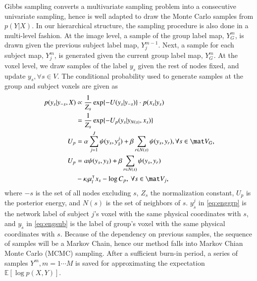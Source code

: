 \documentclass[final,authoryear,5p,twocolumn]{elsarticle}
\begin{document}
Gibbs sampling converts a multivariate sampling problem into a consecutive
univariate sampling, hence is well adapted to draw the Monte Carlo samples from
$p(Y|X)$.  In our hierarchical structure, the sampling procedure is also done in
a multi-level fashion. At the image level, a sample of the group label map,
$Y^m_{G}$, is drawn given the previous subject label map, $Y^{m-1}_j$. Next, a
sample for each subject map, $Y^m_j$, is generated given the current group label
map, $Y^m_G$.  At the voxel level, we draw samples of the label $y_s$ given the
rest of nodes fixed, and update $y_s, \forall s \in V$. The conditional
probability used to generate samples at the group and subject voxels are given
as
\begin{align}
p(y_s | y_{-s},X) &\propto \frac{1}{Z_s}\exp\{-U(y_s | y_{-s})\} \cdot p(x_s | y_s) \\
&= \frac{1}{Z_s}\exp\{-U_p(y_s | y_{N(s)}, x_s)\} \nonumber\\
U_p &= \alpha\sum_{j=1}^J \psi(y_s, y_{\tilde s}^j) + \beta\sum_{r\in N(s)} \psi(y_s,y_r), \forall s \in \mat V_G, \label{eq:enggrp}\\
U_p &= \alpha \psi(y_s,y_{\tilde s}) + \beta\sum_{r\in N(s)} \psi (y_s, y_r) \nonumber \\
& - \kappa_l \mu_l^{\intercal} x_s - \log C_p, \: \forall s \in \mat V_j, \label{eq:engsub}
\end{align}
where $-s$ is the set of all nodes excluding $s$, $Z_s$ the normalization
constant, $U_p$ is the posterior energy, and $N(s)$ is the set of neighbors of
$s$.  $y_{\tilde s}^j$ in \eqref{eq:enggrp} is the network label of subject $j$'s voxel
with the same physical coordinates with $s$, and $y_{\tilde s}$ in
\eqref{eq:engsub} is the label of group's voxel with the same physical coordinates
with $s$. Because of the dependency on previous samples, the sequence of samples
will be a Markov Chain, hence our method falls into Markov Chian Monte Carlo
(MCMC) sampling.  After a sufficient burn-in period, a series of samples $Y^m, m
= 1\cdots M$ is saved for approximating the expectation $\mathbb{E}[\log
  p(X,Y)]$.
\end{document}
